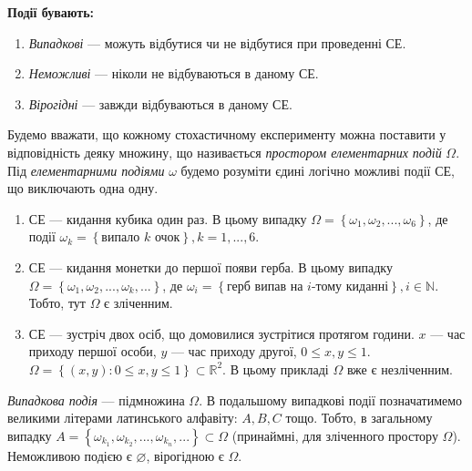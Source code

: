 \noindent \textbf{Події бувають:}
\begin{enumerate}
    \item \emph{Випадкові} --- можуть відбутися чи не відбутися при проведенні СЕ.
    \item \emph{Неможливі} --- ніколи не відбуваються в даному СЕ.
    \item \emph{Вірогідні} --- завжди відбуваються в даному СЕ.
\end{enumerate}
\begin{definition}
    Будемо вважати, що кожному стохастичному експерименту можна поставити у відповідність деяку множину, що
    називається \emph{простором елементарних подій} $\Omega$. 
    Під \emph{елементарними подіями} $\omega$ будемо розуміти єдині
    логічно можливі події СЕ, що виключають одна одну.
\end{definition}
\begin{example}
    \begin{enumerate}
        \item СЕ --- кидання кубика один раз. В цьому випадку
        $\Omega = \left\{\omega_1, \omega_2, ..., \omega_6\right\}$, 
        де події 
        $\omega_k = \left\{\text{випало } k \text{ очок}\right\}, k = 1,...,6$.
        \item СЕ --- кидання монетки до першої появи герба. В цьому випадку
        $\Omega = \left\{\omega_1, \omega_2, ..., \omega_k, ...\right\}$,  
        де $\omega_i = \left\{\text{герб випав на }i\text{-тому киданні}\right\}, i\in \mathbb{N}$.
        Тобто, тут $\Omega$ є зліченним.
        \item СЕ --- зустріч двох осіб, що домовилися зустрітися протягом години.
        $x$ --- час приходу першої особи, $y$ --- час приходу другої, $0\leq x, y \leq 1$.
        $\Omega = \left\{ \left( x, y\right): 0\leq x, y \leq 1\right\}\subset \mathbb{R}^2$.
        В цьому прикладі $\Omega$ вже є незліченним.
    \end{enumerate}
\end{example}
\begin{definition}
    \emph{Випадкова подія} --- підмножина $\Omega$. В подальшому випадкові події позначатимемо великими літерами латинського алфавіту: $A, B, C$ тощо.
    Тобто, в загальному випадку $A = \left\{\omega_{k_1}, \omega_{k_2}, ..., \omega_{k_n}, ...\right\} \subset \Omega$
    (принаймні, для зліченного простору $\Omega$).
    Неможливою подією є $\varnothing$, вірогідною є $\Omega$. 
\end{definition}

